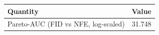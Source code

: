 \begin{tabular}{l c}
\toprule
Quantity & Value \\
\midrule
Pareto-AUC (FID vs NFE, log-scaled) & 31.748 \\
\bottomrule
\end{tabular}